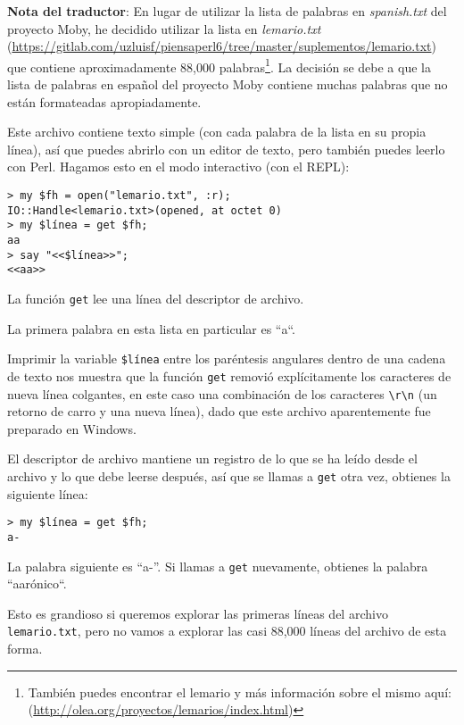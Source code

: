 \begin{description}
\item {\bf Nota del traductor}: En lugar de utilizar la lista de palabras en \emph{spanish.txt}
del proyecto Moby, he decidido utilizar la lista en \emph{lemario.txt} (\url{https://gitlab.com/uzluisf/piensaperl6/tree/master/suplementos/lemario.txt}) 
que contiene aproximadamente 88,000 palabras\footnote{
También puedes encontrar el lemario y más información sobre el mismo aquí: (\url{http://olea.org/proyectos/lemarios/index.html})}. La decisión se debe a que la lista de 
palabras en español del proyecto Moby contiene muchas palabras que no están
formateadas apropiadamente. 
\end{description}

Este archivo contiene texto simple (con cada palabra de la lista
en su propia línea), así que puedes abrirlo con un editor de texto,
pero también puedes leerlo con Perl. Hagamos esto en el modo
interactivo (con el REPL):

\begin{verbatim}
> my $fh = open("lemario.txt", :r);
IO::Handle<lemario.txt>(opened, at octet 0)
> my $línea = get $fh;
aa
> say "<<$línea>>";
<<aa>>
\end{verbatim}

La función {\tt get} lee una línea del descriptor de archivo.

La primera palabra en esta lista en particular es ``a``.

Imprimir la variable \verb|$línea| entre los paréntesis angulares
dentro de una cadena de texto nos muestra que la función {\tt get}
removió explícitamente los caracteres de nueva línea colgantes, en este
caso una combinación de los caracteres \verb|\r\n| (un retorno de carro
 y una nueva línea), dado que este archivo aparentemente fue preparado en Windows.

El descriptor de archivo mantiene un registro de lo que se ha leído
desde el archivo y lo que debe leerse después, así que se llamas
a {\tt get} otra vez, obtienes la siguiente línea:

\begin{verbatim}
> my $línea = get $fh;
a-
\end{verbatim}
%
La palabra siguiente es ``a-''. Si llamas a {\tt get} nuevamente,
obtienes la palabra ``aarónico``. 

Esto es grandioso si queremos explorar las primeras líneas del
archivo {\tt lemario.txt}, pero no vamos a explorar las casi 
88,000 líneas del archivo de esta forma.

